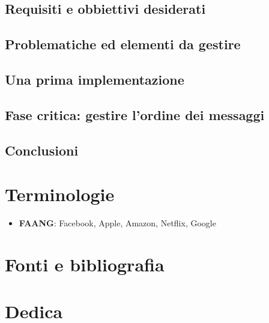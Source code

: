 \documentclass[a4paper, titlepage, 12pt, openright, twoside]{book}
\begin{document}
\section{Requisiti e obbiettivi desiderati}

\section{Problematiche ed elementi da gestire}

\section{Una prima implementazione}

\section{Fase critica: gestire l'ordine dei messaggi}

\section{Conclusioni}

\chapter{Terminologie}\label{chap:terminologie}

\begin{itemize}
	\item \textbf{FAANG}: Facebook, Apple, Amazon, Netflix, Google
\end{itemize}

\chapter{Fonti e bibliografia}\label{chap:fonti}



\chapter{Dedica}\label{chap:dedica}
\end{document}
